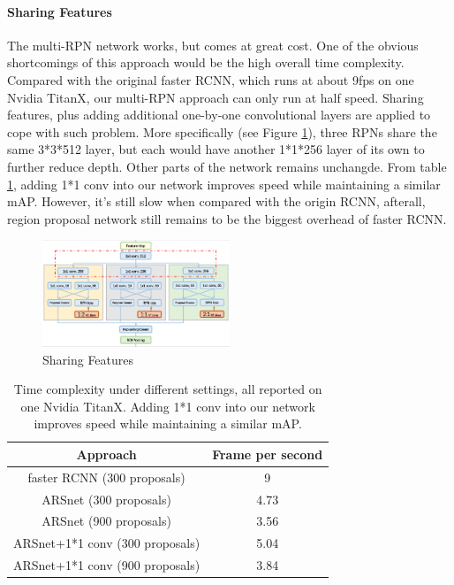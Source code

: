 \documentclass[10pt,twocolumn,letterpaper]{article}
\begin{document}
\paragraph{Sharing Features}
The multi-RPN network works, but comes at great cost. One of the obvious shortcomings of this approach would be the high overall time complexity. Compared with the original faster RCNN, which runs at about 9fps on one Nvidia TitanX, our multi-RPN approach can only run at half speed. Sharing features, plus adding additional one-by-one convolutional layers are applied to cope with such problem. More specifically (see Figure \ref{ARS_sh}), three RPNs share the same 3*3*512 layer, but each would have another 1*1*256 layer of its own to further reduce depth. Other parts of the network remains unchangde. From table \ref{table_fps}, adding 1*1 conv into our network improves speed while maintaining a similar mAP. However, it's still slow when compared with the origin RCNN, afterall, region proposal network still remains to be the biggest overhead of faster RCNN.
    \begin{figure}[!htb]
    \includegraphics[width= 0.5\textwidth]{pic/ARS-archi-share.png}
    \caption{Sharing Features}
    \label{ARS_sh}
    \end{figure}

\begin{table}[ht]
\centering
\begin{tabular}{|c|c|}
\hline Approach & Frame per second \\
\hline faster RCNN (300 proposals) & 9 \\
\hline ARSnet (300 proposals) & 4.73 \\
\hline ARSnet (900 proposals) & 3.56 \\
\hline ARSnet+1*1 conv (300 proposals) & 5.04 \\
\hline ARSnet+1*1 conv (900 proposals) & 3.84 \\
\hline
\end{tabular}
\caption{Time complexity under different settings, all reported on one Nvidia TitanX. Adding 1*1 conv into our network improves speed while maintaining a similar mAP.}
\label{table_fps}
\end{table}
\end{document}
